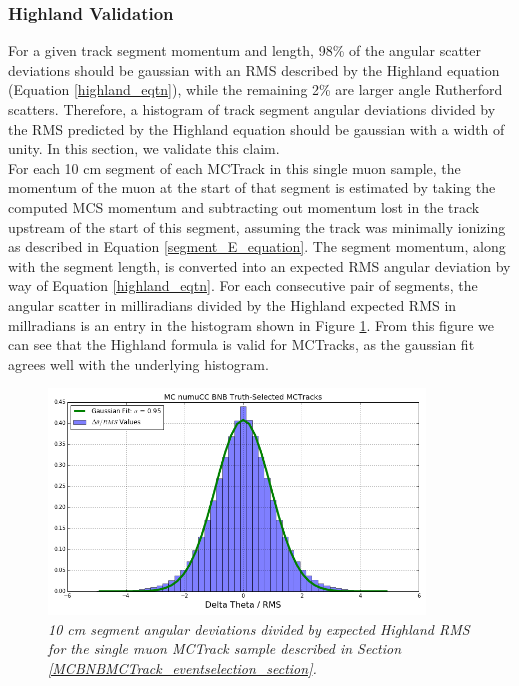 \subsubsection{Highland Validation}\label{Highland_Validation_MCTrack_section}
For a given track segment momentum and length, 98\% of the angular scatter deviations should be gaussian with an RMS described by the Highland equation (Equation \ref{highland_eqtn}), while the remaining 2\% are larger angle Rutherford scatters\cite{highland}. Therefore, a histogram of track segment angular deviations divided by the RMS predicted by the Highland equation should be gaussian with a width of unity. In this section, we validate this claim.\\

For each 10 cm segment of each {\sc MCTrack} in this single muon sample, the momentum of the muon at the start of that segment is estimated by taking the computed MCS momentum and subtracting out momentum lost in the track upstream of the start of this segment, assuming the track was minimally ionizing as described in Equation \ref{segment_E_equation}. The segment momentum, along with the segment length, is converted into an expected RMS angular deviation by way of Equation \ref{highland_eqtn}. For each consecutive pair of segments, the angular scatter in milliradians divided by the Highland expected RMS in millradians is an entry in the histogram shown in Figure \ref{Highland_validation_MCTracks_fig}. From this figure we can see that the Highland formula is valid for {\sc MCTracks}, as the gaussian fit agrees well with the underlying histogram.

\begin{figure}[ht!]
\begin{center}
\includegraphics[width=100mm]{Figures/Highland_validation_MCBNBMCTrack.png}
\end{center}
\caption{\textit{10 cm segment angular deviations divided by expected Highland RMS for the single muon {\sc MCTrack} sample described in Section \ref{MCBNBMCTrack_eventselection_section}.}}
\label{Highland_validation_MCTracks_fig}
\end{figure}




























